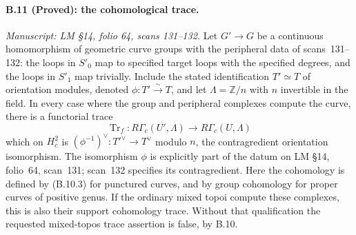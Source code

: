 \paragraph{B.11 (Proved): the cohomological trace.}\label{B11}
\textit{Manuscript: LM \S14, folio 64, scans 131--132.}
Let $G'\to G$ be a continuous homomorphism of geometric
curve groups with the peripheral data of scans~131--132:
the loops in $S'_0$ map to specified target loops with the
specified degrees, and the loops in $S'_1$ map trivially.
Include the stated identification $T'\simeq T$ of
orientation modules, denoted $\phi:T'\xrightarrow{\sim}T$,
and let $\Lambda=\mathbb Z/n$ with $n$ invertible in the field.
In every case where the group and
peripheral complexes compute the curve, there is a
functorial trace
\[
 \operatorname{Tr}_f:R\Gamma_c(U',\Lambda)
                      \longrightarrow R\Gamma_c(U,\Lambda)
                                                               \tag{B.11.1}
\]
which on $H^2_c$ is $(\phi^{-1})^\vee:T'^\vee\to T^\vee$
modulo $n$, the contragredient orientation isomorphism.
The isomorphism $\phi$ is explicitly part of the datum
on LM \S14, folio~64, scan~131; scan~132 specifies its
contragredient. Here the cohomology is defined by (B.10.3)
for punctured curves, and by group cohomology for proper
curves of positive genus. If the ordinary mixed topoi
compute these complexes, this is also their support
cohomology trace. Without that qualification the requested
mixed-topos trace assertion is false, by B.10.

